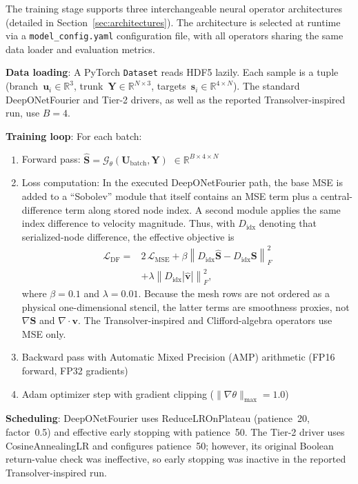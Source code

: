 \documentclass[journal]{IEEEtran}
\newcommand{\added}[1]{#1}
\begin{document}
The training stage supports three interchangeable neural operator architectures (detailed in Section~\ref{sec:architectures}). The architecture is selected at runtime via a \texttt{model\_config.yaml} configuration file, with all operators sharing the same data loader and evaluation metrics.

\textbf{Data loading}: A PyTorch \texttt{Dataset} reads HDF5 lazily. Each sample is a tuple (branch~$\bm{u}_i \in \mathbb{R}^3$, trunk~$\bm{Y} \in \mathbb{R}^{N \times 3}$, targets~$\bm{s}_i \in \mathbb{R}^{4 \times N}$). \added{The standard DeepONetFourier and Tier-2 drivers, as well as the reported Transolver-inspired run, use $B=4$.}

\textbf{Training loop}: For each batch:
\begin{enumerate}
    \item Forward pass: $\hat{\bm{S}} = \mathcal{G}_\theta(\bm{U}_\text{batch}, \bm{Y})$ $\in \mathbb{R}^{B \times 4 \times N}$
    \item Loss computation:  \added{In the executed DeepONetFourier path, the base MSE is added to a ``Sobolev'' module that itself contains an MSE term plus a central-difference term along stored node index. A second module applies the same index difference to velocity magnitude. Thus, with $D_{\mathrm{idx}}$ denoting that serialized-node difference, the effective objective is}
    {
    \begin{equation}
    \begin{aligned}
    \mathcal{L}_{\mathrm{DF}} ={}& 2\,\mathcal{L}_{\mathrm{MSE}}
      + \beta \left\|D_{\mathrm{idx}}\hat{\bm S}-D_{\mathrm{idx}}\bm S\right\|_F^2 \\
      &+ \lambda \left\|D_{\mathrm{idx}}|\hat{\bm v}|\right\|_F^2,
    \end{aligned}
    \label{eq:total_loss}
    \end{equation}}
    \added{where $\beta=0.1$ and $\lambda=0.01$. Because the mesh rows are not ordered as a physical one-dimensional stencil, the latter terms are smoothness proxies, not $\nabla\bm S$ and $\nabla\!\cdot\!\bm v$. The Transolver-inspired and Clifford-algebra operators use MSE only.}
    \item Backward pass with Automatic Mixed Precision (AMP) arithmetic (FP16 forward, FP32 gradients)
    \item Adam optimizer step with gradient clipping ($\|\nabla\theta\|_\text{max} = 1.0$)
\end{enumerate}

\textbf{Scheduling}: DeepONetFourier uses ReduceLROnPlateau (patience~20, factor~0.5) and effective early stopping with patience~50. The Tier-2 driver uses CosineAnnealingLR and configures patience~50; however, its original Boolean return-value check was ineffective, so early stopping was inactive in the reported Transolver-inspired run.
\end{document}
